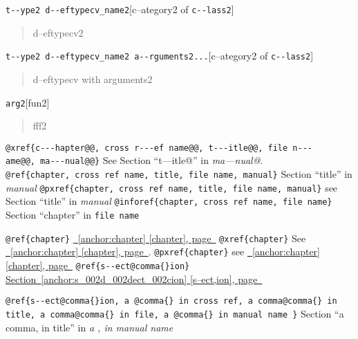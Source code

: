 \documentclass{book}
\begin{document}
\begin{titlepage}
\noindent\texttt{t{-}{-}ype2 d{-}{-}eftypecv\_name2}\hfill[c--ategory2 of \texttt{c{-}{-}lass2}]



%
\begin{quote}
\unskip{\parskip=0pt\noindent}%
d--eftypecv2
\end{quote}

\noindent\texttt{t{-}{-}ype2 d{-}{-}eftypecv\_name2 a{-}{-}rguments2...}\hfill[c--ategory2 of \texttt{c{-}{-}lass2}]



%
\begin{quote}
\unskip{\parskip=0pt\noindent}%
d--eftypecv with arguments2
\end{quote}

\noindent\texttt{arg2}\hfill[fun2]



%
\begin{quote}
\unskip{\parskip=0pt\noindent}%
fff2
\end{quote}


\texttt{@xref\{c{-}{-}{-}hapter@@,\ cross r{-}{-}{-}ef name@@,\ t{-}{-}{-}itle@@,\ file n{-}{-}{-}ame@@,\ ma{-}{-}{-}nual@@\}} See Section ``t---itle@'' in \textsl{ma---nual@}.
\texttt{@ref\{chapter,\ cross ref name,\ title,\ file name,\ manual\}} Section ``title'' in \textsl{manual}
\texttt{@pxref\{chapter,\ cross ref name,\ title,\ file name,\ manual\}} see Section ``title'' in \textsl{manual}
\texttt{@inforef\{chapter,\ cross ref name,\ file name\}} Section ``chapter'' in \texttt{file name}

\texttt{@ref\{chapter\}} \hyperref[anchor:chapter]{\chaptername~\ref*{anchor:chapter} [chapter], page~\pageref*{anchor:chapter}}
\texttt{@xref\{chapter\}} See \hyperref[anchor:chapter]{\chaptername~\ref*{anchor:chapter} [chapter], page~\pageref*{anchor:chapter}}.
\texttt{@pxref\{chapter\}} see \hyperref[anchor:chapter]{\chaptername~\ref*{anchor:chapter} [chapter], page~\pageref*{anchor:chapter}}
\texttt{@ref\{s{-}{-}ect@comma\{\}ion\}} \hyperref[anchor:s_002d_002dect_002cion]{Section~\ref*{anchor:s_002d_002dect_002cion} [s--ect,ion], page~\pageref*{anchor:s_002d_002dect_002cion}}

\texttt{@ref\{s{-}{-}ect@comma\{\}ion,\ a @comma\{\} in cross
ref,\ a comma@comma\{\} in title,\ a comma@comma\{\} in file,\ a @comma\{\} in manual name \}}
Section ``a comma, in title'' in \textsl{a , in manual name}


\end{titlepage}
\end{document}
